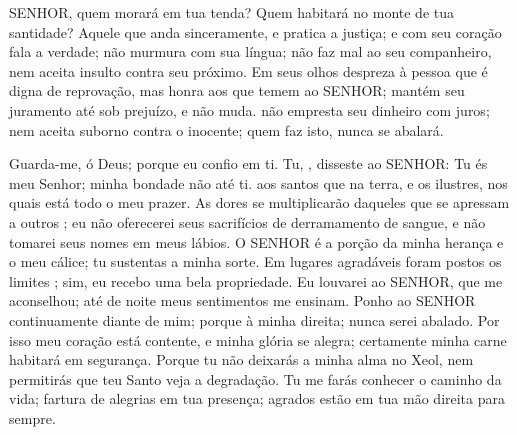 
{\PP 
  SENHOR, quem morará em tua tenda? Quem habitará no monte de tua santidade?
  Aquele que anda sinceramente, e pratica a justiça; e com seu coração fala a verdade;
   não murmura com sua língua; não faz mal ao seu companheiro, nem aceita insulto contra seu próximo.
  Em seus olhos despreza à pessoa que é digna de reprovação, mas honra aos que temem ao SENHOR; mantém seu juramento até sob
{} prejuízo, e não muda.
   não empresta seu dinheiro com juros; nem aceita suborno contra o inocente; quem faz isto, nunca se abalará.
\par }


{\PP 
  Guarda-me, ó Deus; porque eu confio em ti.
  Tu,
{},  disseste ao SENHOR: Tu és meu Senhor; minha bondade não
{} até ti.
   aos santos que
{} na terra, e
{} os ilustres, nos quais está todo o meu prazer.
  As dores se multiplicarão daqueles que se apressam
{} a outros
{} ; eu não oferecerei seus sacrifícios de derramamento de sangue, e não tomarei seus nomes em meus lábios.
  O SENHOR é a porção da minha herança e o meu cálice; tu sustentas a minha sorte.
  Em lugares agradáveis foram postos os limites
{} ; sim, eu recebo uma bela propriedade.
  Eu louvarei ao SENHOR, que me aconselhou; até de noite meus sentimentos me ensinam.
  Ponho ao SENHOR continuamente diante de mim; porque
{} à minha direita; nunca serei abalado.
  Por isso meu coração está contente, e minha glória se alegra; certamente minha carne habitará em segurança.
  Porque tu não deixarás a minha alma no Xeol,
 nem permitirás que teu Santo veja a degradação.
  Tu me farás conhecer o caminho da vida; fartura de alegrias
{} em tua presença; agrados estão em tua mão direita para sempre.
\par }


